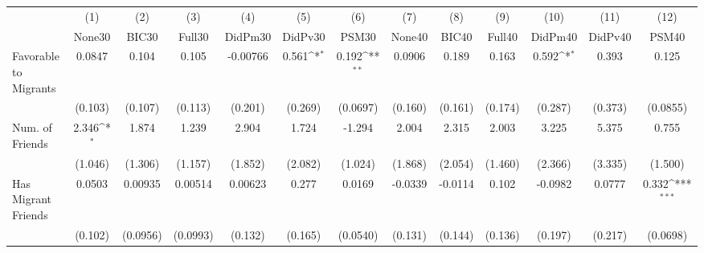 {
\def\sym#1{\ifmmode^{#1}\else\(^{#1}\)\fi}
\begin{tabular}{l*{12}{c}}
\toprule
            &\multicolumn{1}{c}{(1)}&\multicolumn{1}{c}{(2)}&\multicolumn{1}{c}{(3)}&\multicolumn{1}{c}{(4)}&\multicolumn{1}{c}{(5)}&\multicolumn{1}{c}{(6)}&\multicolumn{1}{c}{(7)}&\multicolumn{1}{c}{(8)}&\multicolumn{1}{c}{(9)}&\multicolumn{1}{c}{(10)}&\multicolumn{1}{c}{(11)}&\multicolumn{1}{c}{(12)}\\
            &\multicolumn{1}{c}{None30}&\multicolumn{1}{c}{BIC30}&\multicolumn{1}{c}{Full30}&\multicolumn{1}{c}{DidPm30}&\multicolumn{1}{c}{DidPv30}&\multicolumn{1}{c}{PSM30}&\multicolumn{1}{c}{None40}&\multicolumn{1}{c}{BIC40}&\multicolumn{1}{c}{Full40}&\multicolumn{1}{c}{DidPm40}&\multicolumn{1}{c}{DidPv40}&\multicolumn{1}{c}{PSM40}\\
\midrule
Favorable to Migrants&      0.0847         &       0.104         &       0.105         &    -0.00766         &       0.561\sym{*}  &       0.192\sym{**} &      0.0906         &       0.189         &       0.163         &       0.592\sym{*}  &       0.393         &       0.125         \\
            &     (0.103)         &     (0.107)         &     (0.113)         &     (0.201)         &     (0.269)         &    (0.0697)         &     (0.160)         &     (0.161)         &     (0.174)         &     (0.287)         &     (0.373)         &    (0.0855)         \\
\addlinespace
Num. of Friends&       2.346\sym{*}  &       1.874         &       1.239         &       2.904         &       1.724         &      -1.294         &       2.004         &       2.315         &       2.003         &       3.225         &       5.375         &       0.755         \\
            &     (1.046)         &     (1.306)         &     (1.157)         &     (1.852)         &     (2.082)         &     (1.024)         &     (1.868)         &     (2.054)         &     (1.460)         &     (2.366)         &     (3.335)         &     (1.500)         \\
\addlinespace
Has Migrant Friends&      0.0503         &     0.00935         &     0.00514         &     0.00623         &       0.277         &      0.0169         &     -0.0339         &     -0.0114         &       0.102         &     -0.0982         &      0.0777         &       0.332\sym{***}\\
            &     (0.102)         &    (0.0956)         &    (0.0993)         &     (0.132)         &     (0.165)         &    (0.0540)         &     (0.131)         &     (0.144)         &     (0.136)         &     (0.197)         &     (0.217)         &    (0.0698)         \\

\end{tabular}}
